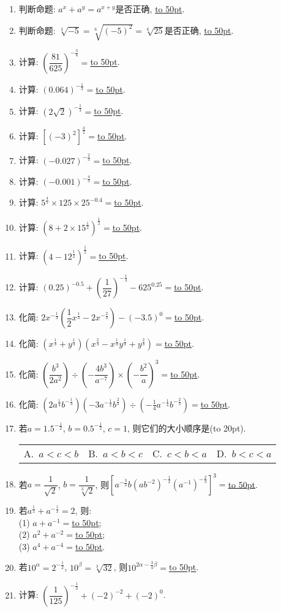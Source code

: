 \documentclass[10pt,a4paper]{article}
\newcommand{\blank}[1]{\underline{\hbox to #1pt{}}}
\newcommand{\bracket}[1]{(\hbox to #1pt{})}
\newcommand{\fourch}[4]{\par\begin{tabular}{p{.23\textwidth}p{.23\textwidth}p{.23\textwidth}p{.23\textwidth}}
A.~#1 &B.~#2& C.~#3& D.~#4
\end{tabular}}
\begin{document}
\begin{enumerate}[1.]
\item 判断命题: $a^x+a^y=a^{x+y}$是否正确, \blank{50}.
\item 判断命题: $\sqrt [3]{-5}=\sqrt [6]{(-5)^2}=\sqrt [6]{25}$是否正确, \blank{50}.
\item 计算: $(\dfrac{81}{625})^{-\frac 34}=$\blank{50}.
\item 计算: $(0.064)^{-\frac 13}=$\blank{50}.
\item 计算: $(2\sqrt 2)^{-\frac 13}=$\blank{50}.
\item 计算: $[ (-3)^2 ]^{\frac 32}=$\blank{50}.
\item 计算: $(-0.027)^{-\frac 23}=$\blank{50}.
\item 计算: $(-0.001)^{-\frac 43}=$\blank{50}.
\item 计算: $5^{\frac 45}\times 125	\times 25^{-0.4}=$\blank{50}.
\item 计算: $(8+2	\times 15^{\frac 12})^{\frac 12}=$\blank{50}.
\item 计算: $(4-12^{\frac 12})^{\frac 12}=$\blank{50}.
\item 计算: $(0.25)^{-0.5}+(\dfrac 1{27})^{-\frac 13}-625^{0.25}=$\blank{50}.
\item 化简: $2x^{-\frac 13}(\dfrac 12x^{\frac 13}-2x^{-\frac 23})-(-3.5)^0=$\blank{50}.
\item 化简: $(x^{\frac 13}+y^{\frac 13})(x^{\frac 23}-x^{\frac 13}y^{\frac 13}+y^{\frac 23})=$\blank{50}.
\item 化简: $(\dfrac{b^3}{2a^2})\div (-\dfrac{4b^3}{a^{-7}})\times (-\dfrac{b^2}a)^3=$\blank{50}.
\item 化简: $(2a^{\frac 14}b^{-\frac 13})(-3a^{-\frac 12}b^{\frac 23})\div (-\frac 14a^{-\frac 14}b^{-\frac 23})=$\blank{50}.
\item 若$a=1.5^{-\frac 12}$, $b=0.5^{-\frac 12}$, $c=1$, 则它们的大小顺序是\bracket{20}.
\fourch{$a<c<b$}{$a<b<c$}{$c<b<a$}{$b<c<a$}
\item 若$a=\dfrac 1{\sqrt 2}$, $b=\dfrac 1{\sqrt[3]2}$, 则$[a^{-\frac 32}b(ab^{-2})^{-\frac 12}(a^{-1})^{-\frac 23}]^3=$\blank{50}.
\item 若$a^{\frac 12}+a^{-\frac 12}=2$, 则:\\
(1) $a+a^{-1}=$\blank{50};\\
(2) $a^2+a^{-2}=$\blank{50};\\
(3) $a^4+a^{-4}=$\blank{50}.
\item 若$10^{\alpha }=2^{-\frac 12}$, $10^{\beta }=\sqrt [3]{32}$, 则$10^{2\alpha -\frac 34\beta }=$\blank{50}.
\item 计算: $(\dfrac 1{125})^{-\frac 13}+(-2)^{-2}+(-2)^0$.

\end{enumerate}
\end{document}
